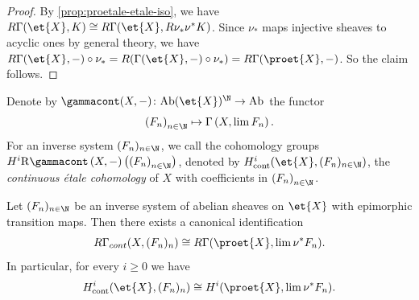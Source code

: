 \begin{proof}
    By \ref{prop:proetale-etale-iso}, we have
    $R \Gamma(\et{X}, K) \cong R \Gamma(\et{X}, R \nu_{*}\nu^*K)$. Since
    $\nu_*$ maps injective sheaves to acyclic ones by general theory, we have
    $R \Gamma(\et{X}, -) \circ \nu_{*} = R (\Gamma(\et{X}, -) \circ \nu_*) = R \Gamma(\proet{X}, -)$.
    So the claim follows.
\end{proof}

\begin{definition}
    Denote by $\gammacont(X, -)\colon \mathrm{Ab}(\et{X})^{\N} \to \mathrm{Ab}$ the functor
    $$\left( F_n \right)_{n \in \N} \mapsto \Gamma\left(X, \lim F_n\right).$$ For an inverse
    system $(F_n)_{n \in \N}$, we call the cohomology groups
    $H^i \mathrm{R} \gammacont\left(X, -\right)\left( \left( F_{n} \right)_{n \in \N} \right) $,
    denoted by $H^i_{\mathrm{cont}}(\et{X}, (F_{n})_{n \in \N})$,
    the \emph{continuous étale cohomology} of $X$ with coefficients in $\left( F_n \right)_{n \in \N}$.

    \label{def:continuous-etale-cohomology}
\end{definition}

\begin{theorem}
    Let $(F_n)_{n \in \N}$ be an inverse system of abelian sheaves on $\et{X}$ with
    epimorphic transition maps. Then there exists a canonical identification
    \[
        R \Gamma_{cont}(X, (F_n)_n) \cong R \Gamma(\proet{X}, \lim \nu^* F_n)
    .\] In particular, for every $i \ge 0$ we have
    \[
        H^i_{\mathrm{cont}}(\et{X}, (F_n)_n) \cong H^i(\proet{X}, \lim \nu^* F_n)
    .\]
    \label{thm:comparison-continuous}
\end{theorem}

